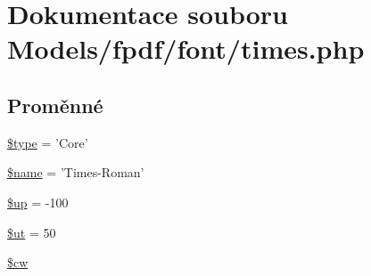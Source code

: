 \hypertarget{times_8php}{\section{Dokumentace souboru Models/fpdf/font/times.php}
\label{times_8php}
}
\subsection*{Proměnné}
\begin{DoxyCompactItemize}
\item 
\hyperlink{times_8php_a9a4a6fba2208984cabb3afacadf33919}{\$type} = 'Core'
\item 
\hyperlink{times_8php_ab2fc40d43824ea3e1ce5d86dee0d763b}{\$name} = 'Times-\/Roman'
\item 
\hyperlink{times_8php_a6b5ad2ac55f9df46e8f34e78fbd6f176}{\$up} = -\/100
\item 
\hyperlink{times_8php_aadd3f841051043ee58e587e840e8dd0b}{\$ut} = 50
\item 
\hyperlink{times_8php_ac2951b03dbb0317e6c61ec920b7479dc}{\$cw}
\end{DoxyCompactItemize}


